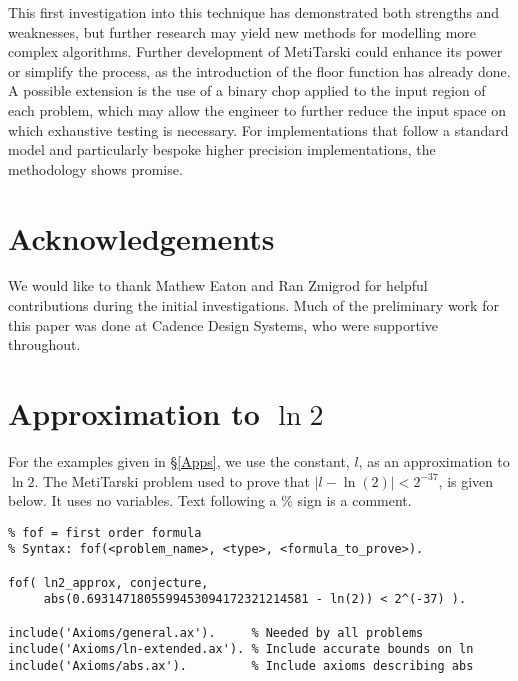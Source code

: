 \documentclass{fac}
\newcommand{\abs}[1]{\lvert#1\rvert}
\begin{document}
This first investigation into this technique has demonstrated both strengths and weaknesses, but further research may yield new methods for modelling more complex algorithms. Further development of MetiTarski could enhance its power or simplify the process, as the introduction of the floor function has already done. A possible extension is the use of a binary chop applied to the input region of each problem, which may allow the engineer to further reduce the input space on which exhaustive testing is necessary. For implementations that follow a standard model and particularly bespoke higher precision implementations, the methodology shows promise.


\section*{Acknowledgements}
We would like to thank Mathew Eaton and Ran Zmigrod for helpful contributions during the initial investigations. Much of the preliminary work for this paper was done at Cadence Design Systems, who were supportive throughout. 


   
  

\appendix
\section{Approximation to $\ln{2}$} \label{ln2_appendix}
For the examples given in \S \ref{Apps}, we use the constant, $l$, as an approximation to $\ln{2}$. The MetiTarski problem used to prove that $\abs{l-\ln{(2)}}<2^{-37}$, is given below. It uses no variables. Text following a \% sign is a comment.
\begin{lstlisting}
% fof = first order formula
% Syntax: fof(<problem_name>, <type>, <formula_to_prove>).

fof( ln2_approx, conjecture,  
     abs(0.6931471805599453094172321214581 - ln(2)) < 2^(-37) ).

include('Axioms/general.ax').     % Needed by all problems
include('Axioms/ln-extended.ax'). % Include accurate bounds on ln
include('Axioms/abs.ax').         % Include axioms describing abs
\end{lstlisting}
\end{document}
